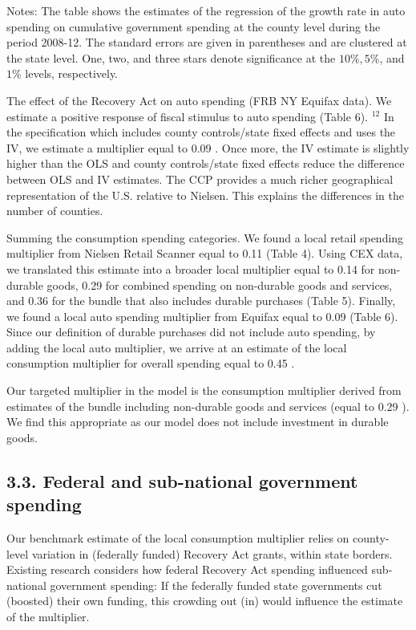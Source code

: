 \documentclass[10pt]{article}
\begin{document}
Notes: The table shows the estimates of the regression of the growth rate in auto spending on cumulative government spending at the county level during the period 2008-12. The standard errors are given in parentheses and are clustered at the state level. One, two, and three stars denote significance at the $10 \%, 5 \%$, and $1 \%$ levels, respectively.

The effect of the Recovery Act on auto spending (FRB NY Equifax data). We estimate a positive response of fiscal stimulus to auto spending (Table 6). ${ }^{12}$ In the specification which includes county controls/state fixed effects and uses the IV, we estimate a multiplier equal to 0.09 . Once more, the IV estimate is slightly higher than the OLS and county controls/state fixed effects reduce the difference between OLS and IV estimates. The CCP provides a much richer geographical representation of the U.S. relative to Nielsen. This explains the differences in the number of counties.

Summing the consumption spending categories. We found a local retail spending multiplier from Nielsen Retail Scanner equal to 0.11 (Table 4). Using CEX data, we translated this estimate into a broader local multiplier equal to 0.14 for non-durable goods, 0.29 for combined spending on non-durable goods and services, and 0.36 for the bundle that also includes durable purchases (Table 5). Finally, we found a local auto spending multiplier from Equifax equal to 0.09 (Table 6). Since our definition of durable purchases did not include auto spending, by adding the local auto multiplier, we arrive at an estimate of the local consumption multiplier for overall spending equal to 0.45 .

Our targeted multiplier in the model is the consumption multiplier derived from estimates of the bundle including non-durable goods and services (equal to 0.29 ). We find this appropriate as our model does not include investment in durable goods.

\subsection*{3.3. Federal and sub-national government spending}
Our benchmark estimate of the local consumption multiplier relies on county-level variation in (federally funded) Recovery Act grants, within state borders. Existing research considers how federal Recovery Act spending influenced sub-national government spending: If the federally funded state governments cut (boosted) their own funding, this crowding out (in) would influence the estimate of the multiplier.
\end{document}
